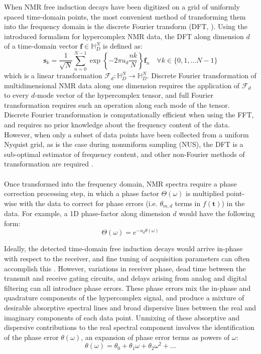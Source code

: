 \begin{doublespace}
When NMR free induction decays have been digitized on a grid of uniformly
spaced time-domain points, the most convenient method of transforming them
into the frequency domain is the discrete Fourier transform (DFT,
\cite{bretthorst:cmr2008,schuyler:jmr2013}). Using the introduced formalism for
hypercomplex NMR data, the DFT along dimension $d$ of a time-domain vector
$\mathbf{f} \in \mathbb{H}_D^N$ is defined as:
\begin{equation}
\mathbf{s}_k = \frac{1}{\sqrt{N}} \sum_{n=0}^{N-1}
  \exp\left\{ -2 \pi u_d \frac{n k}{N} \right\}
  \mathbf{f}_n
  \quad \forall k \in \{ 0, 1, \dots N-1 \}
\end{equation}
which is a linear transformation
$\mathcal{F}_d : \mathbb{H}_D^N \to \mathbb{H}_D^N$. Discrete Fourier
transformation of multidimensional NMR data along one dimension requires the
application of $\mathcal{F}_d$ to every $d$-mode vector of the hypercomplex
tensor, and full Fourier transformation requires such an operation along each
mode of the tensor. Discrete Fourier transformation is computationally
efficient when using the FFT, and requires no prior knowledge about the
frequency content of the data. However, when only a subset of data points
have been collected from a uniform Nyquist grid, as is the case during
nonuniform sampling (NUS), the DFT is a sub-optimal estimator of frequency
content, and other non-Fourier methods of transformation are required
\cite{bretthorst:cmr2008,mobli:pnmrs2014}.
\\\\
Once transformed into the frequency domain, NMR spectra require a phase
correction processing step, in which a phase factor $\Theta(\omega)$ is
multiplied point-wise with the data to correct for phase errors
(i.e. $\theta_{m,d}$ terms in $f(\mathbf{t})$) in the data. For example, a
1D phase-factor along dimension $d$ would have the following form:
\begin{equation}
\Theta(\omega) = e^{ -u_d \theta(\omega) }
\end{equation}

Ideally, the detected time-domain free induction decays would arrive in-phase
with respect to the receiver, and fine tuning of acquisition parameters can
often accomplish this \cite{chylla:jbnmr1998}.
However, variations in receiver phase, dead time
between the transmit and receive gating circuits, and delays arising from
analog and digital filtering can all introduce phase errors. These phase
errors mix the in-phase and quadrature components of the hypercomplex signal,
and produce a mixture of desirable absorptive spectral lines and broad
dispersive lines between the real and imaginary components of each data point.
Unmixing of these absorptive and dispersive contributions to the real spectral
component involves the identification of the phase error $\theta(\omega)$, an
expansion of phase error terms as powers of $\omega$:
\begin{equation}
\theta(\omega) = \theta_0 + \theta_1 \omega + \theta_2 \omega^2 + \dots
\end{equation}


\end{doublespace}
